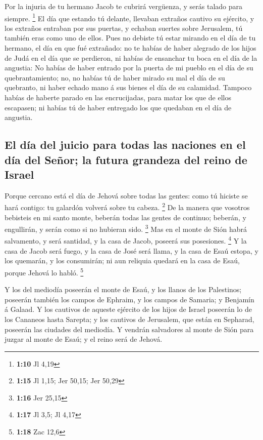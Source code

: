  Por la injuria de tu hermano Jacob te cubrirá vergüenza, y
serás talado para siempre. \footnote{\textbf{1:10} Jl 4,19}
 El día que estando tú delante, llevaban extraños cautivo
su ejército, y los extraños entraban por sus puertas, y echaban suertes
sobre Jerusalem, tú también eras como uno de ellos.  Pues
no debiste tú estar mirando en el día de tu hermano, el día en que fué
extrañado: no te habías de haber alegrado de los hijos de Judá en el día
que se perdieron, ni habías de ensanchar tu boca en el día de la
angustia:  No habías de haber entrado por la puerta de mi
pueblo en el día de su quebrantamiento; no, no habías tú de haber mirado
su mal el día de su quebranto, ni haber echado mano á sus bienes el día
de su calamidad.  Tampoco habías de haberte parado en las
encrucijadas, para matar los que de ellos escapasen; ni habías tú de
haber entregado los que quedaban en el día de angustia.

\hypertarget{el-duxeda-del-juicio-para-todas-las-naciones-en-el-duxeda-del-seuxf1or-la-futura-grandeza-del-reino-de-israel}{%
\subsection{El día del juicio para todas las naciones en el día del
Señor; la futura grandeza del reino de
Israel}\label{el-duxeda-del-juicio-para-todas-las-naciones-en-el-duxeda-del-seuxf1or-la-futura-grandeza-del-reino-de-israel}}

 Porque cercano está el día de Jehová sobre todas las
gentes: como tú hiciste se hará contigo: tu galardón volverá sobre tu
cabeza. \footnote{\textbf{1:15} Jl 1,15; Jer 50,15; Jer 50,29}
 De la manera que vosotros bebisteis en mi santo monte,
beberán todas las gentes de continuo; beberán, y engullirán, y serán
como si no hubieran sido. \footnote{\textbf{1:16} Jer 25,15}
 Mas en el monte de Sión habrá salvamento, y será santidad,
y la casa de Jacob, poseerá sus posesiones. \footnote{\textbf{1:17} Jl
  3,5; Jl 4,17}  Y la casa de Jacob será fuego, y la casa
de José será llama, y la casa de Esaú estopa, y los quemarán, y los
consumirán; ni aun reliquia quedará en la casa de Esaú, porque Jehová lo
habló. \footnote{\textbf{1:18} Zac 12,6}

 Y los del mediodía poseerán el monte de Esaú, y los llanos
de los Palestinos; poseerán también los campos de Ephraim, y los campos
de Samaria; y Benjamín á Galaad.  Y los cautivos de aqueste
ejército de los hijos de Israel poseerán lo de los Cananeos hasta
Sarepta; y los cautivos de Jerusalem, que están en Sepharad, poseerán
las ciudades del mediodía.  Y vendrán salvadores al monte
de Sión para juzgar al monte de Esaú; y el reino será de Jehová.
